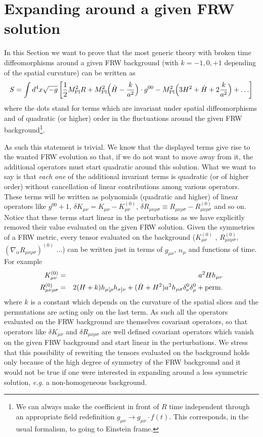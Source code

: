 \documentclass[12pt,letterpaper]{article}
\def\be{\begin{eqnarray}}
\def\ee{\end{eqnarray}}
\begin{document}
{\section{Expanding around a given FRW solution\label{app:tadpoles}}
In this Section we want to prove that the most generic theory with broken time diffeomorphisms around a given FRW background (with $k=-1,0,+1$ depending of the spatial curvature) can be written as
\be
S = \int d^4x \sqrt{-g} \left[\frac12 M_{\rm Pl}^2 R + M_{\rm Pl}^2 \Big(\dot H-\frac{k}{a^2}\Big) \cdot g^{00} - M_{\rm Pl}^2 \Big(3 H^2 +\dot H+2\frac{k}{a^2}\Big) + \ldots \right]
\label{eq:general}
\ee
where the dots stand for terms which are invariant under spatial
diffeomorphisms and  of quadratic (or higher) order in the
fluctuations around the given FRW background\footnote{We can always
  make the coefficient in front of $R$ time independent through an
  appropriate field redefinition $g_{\mu\nu} \to g_{\mu\nu} \cdot
  f(t)$. This corresponds, in the usual formalism, to going to Einstein frame.}. 

As such this statement is trivial. We know that the displayed terms give rise to the wanted FRW evolution so that, if we do not want to move away from it, the additional operators must start quadratic around this solution. What we want to say is that {\em each one} of the additional invariant terms is quadratic (or of higher order) without cancellation of linear contributions among various operators. These terms will be written as polynomials (quadratic and higher) of linear operators like $g^{00}+1$, $\delta K_{\mu\nu}= K_{\mu\nu} -K_{\mu\nu}^{(0)}$, $\delta R_{\mu\nu\rho\sigma} \equiv R_{\mu\nu\rho\sigma} - R_{\mu\nu\rho\sigma}^{(0)}$ and so on. Notice that these terms start linear in the perturbations as we have explicitly removed their value evaluated on the given FRW solution. Given the symmetries of a FRW metric, every tensor evaluated on the background ($K_{\mu\nu}^{(0)}$ , $R_{\mu\nu\rho\sigma}^{(0)}$, $(\nabla_\alpha R_{\mu\nu\rho\sigma})^{(0)}$ ...) can be written just in terms of $g_{\mu\nu}$, $n_\mu$ and functions of time. For example 
\begin{eqnarray}
K^{(0)}_{\mu\nu} & =&  a^2 H h_{\mu\nu} \\
R_{\mu\nu\rho\sigma}^{(0)} & = & 2 (H+k) h_{\mu [\rho} h_{\sigma ] \nu} + (\dot H + H^2) a^2 h_{\mu\sigma} \delta_\nu^0 \delta_\rho^0 + {\rm perm.} 
\end{eqnarray} 
where $k$ is a constant which depends on the curvature of the spatial slices and the permutations are acting only on the last term. As such all the operators evaluated on the FRW background are themselves covariant operators, so that operators like $\delta K_{\mu\nu}$ and $\delta R_{\mu\nu\rho\sigma}$ are well defined covariant operators which vanish on the given FRW background and start linear in the perturbations.
We stress that this possibility of rewriting the tensors evaluated on the background holds only because of the high degree of symmetry of the FRW background and it would not be true if one were interested in expanding around a less symmetric solution, {\em e.g.} a non-homogeneous background.
 
}
\end{document}
